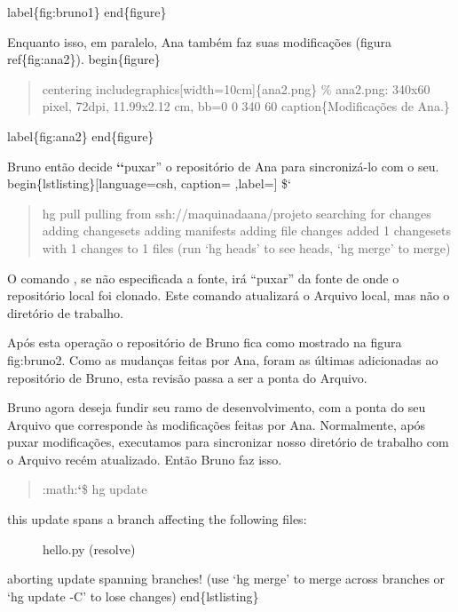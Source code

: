 \documentclass[a4paper,10pt,portuguese]{sphinxmanual}
\begin{document}
label\{fig:bruno1\}
end\{figure\}

Enquanto isso, em paralelo, Ana também faz suas modificações (figura ref\{fig:ana2\}).
begin\{figure\}
\begin{quote}

centering
includegraphics{[}width=10cm{]}\{ana2.png\}
\% ana2.png: 340x60 pixel, 72dpi, 11.99x2.12 cm, bb=0 0 340 60
caption\{Modificações de Ana.\}
\end{quote}

label\{fig:ana2\}
end\{figure\}

Bruno então decide {\color{red}\bfseries{}{}`{}`}puxar'' o repositório de Ana para sincronizá-lo com o seu.
begin\{lstlisting\}{[}language=csh, caption= ,label={]}
\${}`
\begin{quote}

hg pull pulling from ssh://maquinadaana/projeto searching for
changes adding changesets adding manifests adding file changes
added 1 changesets with 1 changes to 1 files (run `hg heads' to see
heads, `hg merge' to merge)
\end{quote}

O comando , se não especificada a fonte, irá ``puxar'' da
fonte de onde o repositório local foi clonado. Este comando
atualizará o Arquivo local, mas não o diretório de trabalho.

Após esta operação o repositório de Bruno fica como mostrado na
figura fig:bruno2. Como as mudanças feitas por Ana, foram as
últimas adicionadas ao repositório de Bruno, esta revisão passa a
ser a ponta do Arquivo.

Bruno agora deseja fundir seu ramo de desenvolvimento, com a ponta
do seu Arquivo que corresponde às modificações feitas por Ana.
Normalmente, após puxar modificações, executamos  para
sincronizar nosso diretório de trabalho com o Arquivo recém
atualizado. Então Bruno faz isso.
\begin{quote}

:math:{\color{red}\bfseries{}{}`}\$ hg update
\end{quote}
\begin{description}
\item[{this update spans a branch affecting the following files:}] \leavevmode
hello.py (resolve)

\end{description}

aborting update spanning branches!
(use `hg merge' to merge across branches or `hg update -C' to lose changes)
end\{lstlisting\}
\end{document}
